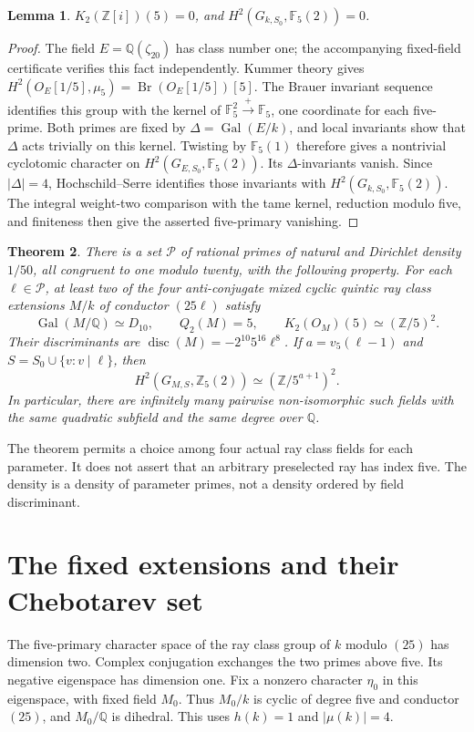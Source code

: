 \documentclass[11pt]{article}
\newtheorem{theorem}{Theorem}
\newtheorem{lemma}[theorem]{Lemma}
\theoremstyle{remark}\newtheorem{remark}[theorem]{Remark}
\newcommand{\Q}{\mathbb Q}\newcommand{\Z}{\mathbb Z}
\newcommand{\F}{\mathbb F}\newcommand{\Gal}{\operatorname{Gal}}
\begin{document}
\begin{lemma}\label{lem:base}
\(K_2(\Z[i])(5)=0\), and \(H^2(G_{k,S_0},\F_5(2))=0\).
\end{lemma}
\begin{proof}
The field \(E=\Q(\zeta_{20})\) has class number one; the accompanying
fixed-field certificate verifies this fact independently. Kummer theory gives
\(H^2(O_E[1/5],\mu_5)=\operatorname{Br}(O_E[1/5])[5]\).
The Brauer invariant sequence identifies this group with the kernel of
\(\F_5^2\xrightarrow{+}\F_5\), one coordinate for each five-prime.
Both primes are fixed by \(\Delta=\Gal(E/k)\), and local invariants show
that \(\Delta\) acts trivially on this kernel. Twisting by
\(\F_5(1)\) therefore gives a nontrivial cyclotomic character on
\(H^2(G_{E,S_0},\F_5(2))\). Its \(\Delta\)-invariants vanish.
Since \(|\Delta|=4\), Hochschild--Serre identifies those invariants with
\(H^2(G_{k,S_0},\F_5(2))\). The integral weight-two comparison with the
tame kernel, reduction modulo five, and finiteness then give the asserted
five-primary vanishing.
\end{proof}

\begin{theorem}\label{thm:main}
There is a set \(\mathcal P\) of rational primes of natural and Dirichlet density
\(1/50\), all congruent to one modulo twenty, with the following property.
For each \(\ell\in\mathcal P\), at least two of the four anti-conjugate mixed
cyclic quintic ray class extensions \(M/k\) of conductor \((25\ell)\) satisfy
\[
 \Gal(M/\Q)\simeq D_{10},\qquad Q_2(M)=5,
 \qquad K_2(O_M)(5)\simeq(\Z/5)^2.
\]
Their discriminants are
\(\operatorname{disc}(M)=-2^{10}5^{16}\ell^8\).
If \(a=v_5(\ell-1)\) and \(S=S_0\cup\{v:v\mid\ell\}\), then
\[
 H^2(G_{M,S},\Z_5(2))\simeq(\Z/5^{a+1})^2.
\]
In particular, there are infinitely many pairwise non-isomorphic such fields
with the same quadratic subfield and the same degree over \(\Q\).
\end{theorem}

The theorem permits a choice among four actual ray class fields for each
parameter. It does not assert that an arbitrary preselected ray has index five.
The density is a density of parameter primes, not a density ordered by field
discriminant.

\section{The fixed extensions and their Chebotarev set}
The five-primary character space of the ray class group of \(k\) modulo
\((25)\) has dimension two. Complex conjugation exchanges the two primes above
five. Its negative eigenspace has dimension one. Fix a nonzero character
\(\eta_0\) in this eigenspace, with fixed field \(M_0\). Thus \(M_0/k\) is
cyclic of degree five and conductor \((25)\), and \(M_0/\Q\) is dihedral.
This uses \(h(k)=1\) and \(|\mu(k)|=4\).
\end{document}
